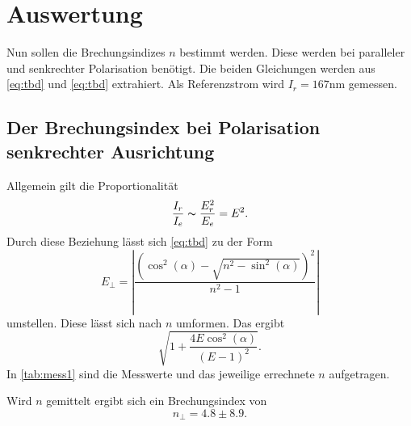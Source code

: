 \section{Auswertung}
\label{sec:Auswertung}

Nun sollen die Brechungsindizes $n$ bestimmt werden.
Diese werden bei paralleler und senkrechter Polarisation benötigt.
Die beiden Gleichungen werden aus \autoref{eq:tbd} und \autoref{eq:tbd} extrahiert.
Als Referenzstrom wird $I_r = 167 \unit{\nano\meter}$ gemessen.


\subsection{Der Brechungsindex bei Polarisation senkrechter Ausrichtung}

Allgemein gilt die Proportionalität 
\begin{equation}
  \frac{I_r}{I_e} \thicksim \frac{E_r^2}{E_e} = E^2.
\end{equation}
Durch diese Beziehung lässt sich \autoref{eq:tbd} zu der Form
\begin{equation*}
  E_{\perp}=\left|\frac{\left(\cos ^{2}(\alpha) - \sqrt{n^{2}-\sin ^{2}(\alpha)} \right)^{2}}{n^{2}-1}\right|
\end{equation*}
umstellen.
Diese lässt sich nach $n$ umformen.
Das ergibt
\begin{equation}\label{eq:n1}
  \sqrt{1 + \frac{4 E \cos ^2(\alpha)}{(E - 1)^2}}.
\end{equation}
In \autoref{tab:mess1} sind die Messwerte und das jeweilige errechnete $n$ aufgetragen.

Wird $n$ gemittelt ergibt sich ein Brechungsindex von 
\begin{equation*}
  n_{\perp} = 4.8 ± 8.9. 
\end{equation*}


